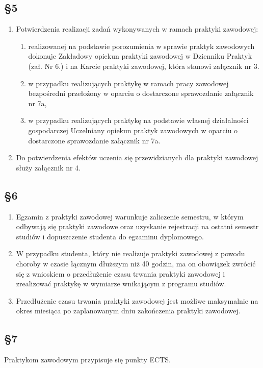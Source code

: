 \documentclass[12pt,a4paper]{article}
\begin{document}
\subsection*{\S 5}
\begin{enumerate}
    \item Potwierdzenia realizacji zadań wykonywanych w ramach praktyki zawodowej:
    \begin{enumerate}[label=\alph*)]
        \item realizowanej na podstawie porozumienia w sprawie praktyk zawodowych dokonuje Zakładowy opiekun praktyki zawodowej w Dzienniku Praktyk (zał. Nr 6.) i na Karcie praktyki zawodowej, która stanowi załącznik nr 3.
        \item w przypadku realizujących praktykę w ramach pracy zawodowej bezpośredni przełożony w oparciu o dostarczone sprawozdanie załącznik nr 7a,
        \item w przypadku realizujących praktykę na podstawie własnej działalności gospodarczej Uczelniany opiekun praktyk zawodowych w oparciu o dostarczone sprawozdanie załącznik nr 7a.
    \end{enumerate}
    \item Do potwierdzenia efektów uczenia się przewidzianych dla praktyki zawodowej służy załącznik nr 4.
\end{enumerate}

\subsection*{\S 6}
\begin{enumerate}
    \item Egzamin z praktyki zawodowej warunkuje zaliczenie semestru, w którym odbywają się praktyki zawodowe oraz uzyskanie rejestracji na ostatni semestr studiów i dopuszczenie studenta do egzaminu dyplomowego.
    \item W przypadku studenta, który nie realizuje praktyki zawodowej z powodu choroby w czasie łącznym dłuższym niż 40 godzin, ma on obowiązek zwrócić się z wnioskiem o przedłużenie czasu trwania praktyki zawodowej i zrealizować praktykę w wymiarze wnikającym z programu studiów.
    \item Przedłużenie czasu trwania praktyki zawodowej jest możliwe maksymalnie na okres miesiąca po zaplanowanym dniu zakończenia praktyki zawodowej.
\end{enumerate}

\subsection*{\S 7}
Praktykom zawodowym przypisuje się punkty ECTS.
\end{document}
